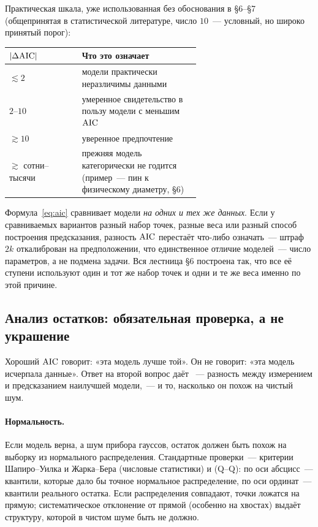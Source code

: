 \noindent
Практическая шкала, уже использованная без обоснования в §6--§7 (общепринятая в статистической
литературе, число $10$~--- условный, но широко принятый порог):

\begin{center}
\footnotesize
\setlength{\tabcolsep}{8pt}
\begin{tabular}{@{}lp{0.62\linewidth}@{}}
\toprule
$|\Delta\mathrm{AIC}|$ & \textbf{Что это означает} \\
\midrule
$\lesssim2$    & модели практически неразличимы данными \\
$2$--$10$      & умеренное свидетельство в пользу модели с меньшим $\operatorname{AIC}$ \\
$\gtrsim10$    & уверенное предпочтение \\
$\gtrsim$ сотни--тысячи & прежняя модель категорически не годится (пример~--- пин к физическому
диаметру, §6) \\
\bottomrule
\end{tabular}
\end{center}

\begin{warning}
Формула~\eqref{eq:aic} сравнивает модели \emph{на одних и тех же данных}. Если у сравниваемых
вариантов разный набор точек, разные веса или разный способ построения предсказания, разность
$\operatorname{AIC}$ перестаёт что-либо означать~--- штраф $2k$ откалиброван на предположении, что единственное
отличие моделей~--- число параметров, а не подмена задачи. Вся лестница §6 построена так, что все
её ступени используют один и тот же набор точек и одни и те же веса именно по этой причине.
\end{warning}

\subsection{Анализ остатков: обязательная проверка, а не украшение}
\label{subsec:residuals}

Хороший $\operatorname{AIC}$ говорит: «эта модель лучше той». Он не говорит: «эта модель исчерпала данные».
Ответ на второй вопрос даёт ~--- разность между измерением и предсказанием
наилучшей модели,~--- и то, насколько он похож на чистый шум.

\paragraph{Нормальность.} Если модель верна, а шум прибора гауссов, остаток должен быть похож на
выборку из нормального распределения. Стандартные проверки~--- критерии Шапиро--Уилка и
Жарка--Бера (числовые статистики) и  (Q--Q): по оси абсцисс~---
квантили, которые дало бы точное нормальное распределение, по оси ординат~--- квантили реального
остатка. Если распределения совпадают, точки ложатся на прямую; систематическое отклонение от
прямой (особенно на хвостах) выдаёт структуру, которой в чистом шуме быть не должно.

